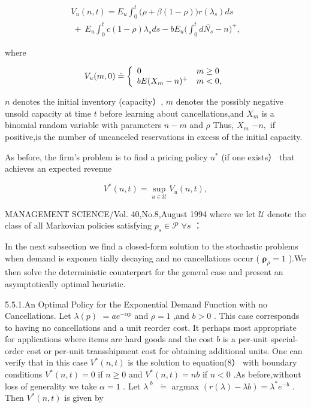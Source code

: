 \[
\begin{array} { l } { { \displaystyle V _ { u } ( n , t ) = E _ { u } \int _ { 0 } ^ { t } \big ( \rho + \beta ( 1 - \rho ) \big ) r ( \lambda _ { s } ) d s } } \\ { { \displaystyle ~ + ~ E _ { u } \int _ { 0 } ^ { t } c ( 1 - \rho ) \lambda _ { s } d s - b E _ { u } \Bigg ( \int _ { 0 } ^ { t } d \bar { N _ { s } } - n \Bigg ) ^ { + } , } } \end{array}
\]

where

\[
\begin{array} { r } { V _ { u } ( m , 0 ) \doteq \left\{ \begin{array} { l l } { 0 } & { m \ge 0 } \\ { b E ( X _ { m } - n ) ^ { + } } & { m < 0 , } \end{array} \right. } \end{array}
\]

\(n\) denotes the initial inventory (capacity）, \(m\) denotes the
possibly negative unsold capacity at time \(t\) before learning about
cancellations,and \(X _ { m }\) is a binomial random variable with
parameters \(n - m\) and \(\rho\) Thus, \(X _ { m }\) \(- n ,\) if
positive,is the number of uncanceled reservations in excess of the
initial capacity.

As before, the firm's problem is to find a pricing policy \(u ^ { * }\)
(if one exists） that achieves an expected revenue

\[
V ^ { * } ( n , t ) = \operatorname* { s u p } _ { u \in \mathcal { U } } V _ { u } ( n , t ) ,
\]

MANAGEMENT SCIENCE/Vol. 40,No.8,August 1994 where we let
\(\mathcal { U }\) denote the class of all Markovian policies satisfying
\(p _ { s } \in \mathcal { P }\) \(\forall s\) ：

In the next subsection we find a closed-form solution to the stochastic
problems when demand is exponen tially decaying and no cancellations
occur ( \(\mathbf { \rho } _ { \rho } = 1\) ).We then solve the
deterministic counterpart for the general case and present an
asymptotically optimal heuristic.

5.5.1.An Optimal Policy for the Exponential Demand Function with no
Cancellations. Let \(\lambda ( p )\) \(= a e ^ { - \alpha p }\) and
\(\rho = 1\) ,and \(b > 0\) . This case corresponds to having no
cancellations and a unit reorder cost. It perhaps most appropriate for
applications where items are hard goods and the cost \(b\) is a per-unit
special-order cost or per-unit transshipment cost for obtaining
additional units. One can verify that in this case
\(V ^ { * } ( n , t )\) is the solution to equation(8） with boundary
conditions \(V ^ { * } ( n , t ) = 0\) if \(n \geq 0\) and
\(V ^ { * } ( n , t ) = n b\) if \(n < 0\) .As before,without loss of
generality we take \(\alpha = 1\) . Let \(\lambda ^ { \textit { b } }\)
\(\dot { = }\) argmax
\(( r ( \lambda ) - \lambda b ) = \lambda ^ { * } e ^ { - b }\) . Then
\(V ^ { * } ( n , t )\) is given by

